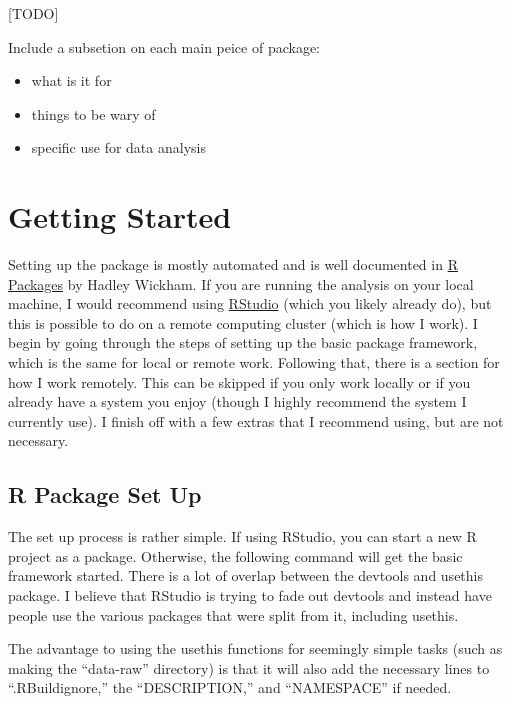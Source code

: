 \documentclass[]{book}
\providecommand{\tightlist}{%
  \setlength{\itemsep}{0pt}\setlength{\parskip}{0pt}}
\begin{document}
{[}TODO{]}

Include a subsetion on each main peice of package:

\begin{itemize}
\tightlist
\item
  what is it for
\item
  things to be wary of
\item
  specific use for data analysis
\end{itemize}

\hypertarget{getting-started}{%
\chapter{Getting Started}\label{getting-started}}

Setting up the package is mostly automated and is well documented in \href{http://r-pkgs.had.co.nz/intro.html}{R Packages} by Hadley Wickham. If you are running the analysis on your local machine, I would recommend using \href{https://www.rstudio.com}{RStudio} (which you likely already do), but this is possible to do on a remote computing cluster (which is how I work). I begin by going through the steps of setting up the basic package framework, which is the same for local or remote work. Following that, there is a section for how I work remotely. This can be skipped if you only work locally or if you already have a system you enjoy (though I highly recommend the system I currently use). I finish off with a few extras that I recommend using, but are not necessary.

\hypertarget{r-package-set-up}{%
\section{R Package Set Up}\label{r-package-set-up}}

The set up process is rather simple. If using RStudio, you can start a new R project as a package. Otherwise, the following command will get the basic framework started. There is a lot of overlap between the devtools and usethis package. I believe that RStudio is trying to fade out devtools and instead have people use the various packages that were split from it, including usethis.

The advantage to using the usethis functions for seemingly simple tasks (such as making the ``data-raw'' directory) is that it will also add the necessary lines to ``.RBuildignore,'' the ``DESCRIPTION,'' and ``NAMESPACE'' if needed.
\end{document}
